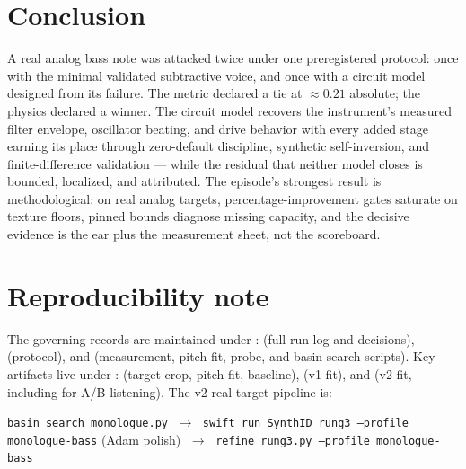 \documentclass[10pt]{article}
\newcommand{\code}[1]{\texttt{#1}}
\begin{document}
\section{Conclusion}

A real analog bass note was attacked twice under one preregistered protocol: once with the minimal validated subtractive voice, and once with a circuit model designed from its failure. The metric declared a tie at $\approx 0.21$ absolute; the physics declared a winner. The circuit model recovers the instrument's measured filter envelope, oscillator beating, and drive behavior with every added stage earning its place through zero-default discipline, synthetic self-inversion, and finite-difference validation --- while the residual that neither model closes is bounded, localized, and attributed. The episode's strongest result is methodological: on real analog targets, percentage-improvement gates saturate on texture floors, pinned bounds diagnose missing capacity, and the decisive evidence is the ear plus the measurement sheet, not the scoreboard.

\section*{Reproducibility note}

The governing records are maintained under :  (full run log and decisions),  (protocol), and  (measurement, pitch-fit, probe, and basin-search scripts). Key artifacts live under :  (target crop, pitch fit, baseline),  (v1 fit), and  (v2 fit, including  for A/B listening). The v2 real-target pipeline is:

\begin{center}
\small
\code{basin\_search\_monologue.py} $\;\to\;$ \code{swift run SynthID rung3 --profile monologue-bass} (Adam polish) $\;\to\;$ \code{refine\_rung3.py --profile monologue-bass}
\end{center}
\end{document}
